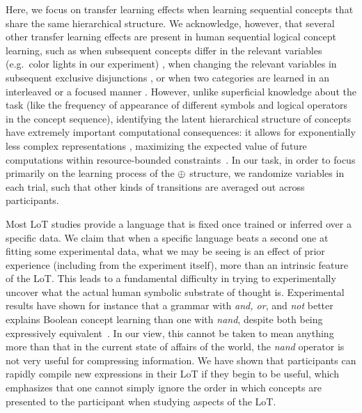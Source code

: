 \par Here, we focus on transfer learning effects when learning sequential concepts that share the same hierarchical structure. We acknowledge, however, that several other transfer learning effects are present in human sequential logical concept learning, such as when subsequent concepts differ in the relevant variables (e.g.\  color lights in our experiment) \cite{blair2009extremely}, when changing the relevant variables in subsequent exclusive disjunctions \cite{kruschke1996dimensional}, or when two categories are learned in an interleaved or a focused manner \cite{carvalho2014putting}. However, unlike superficial knowledge about the task (like the frequency of appearance of different symbols and logical operators in the concept sequence), identifying the latent hierarchical structure of concepts have extremely important computational consequences: it allows for exponentially less complex representations \cite{bengio2013representation,lake2015human}, maximizing the expected value of future computations within resource-bounded constraints~\cite{gershman2015computational}. In our task, in order to focus primarily on the learning process of the $\oplus$ structure, we randomize variables in each trial, such that other kinds of transitions are averaged out across participants. 

\par Most LoT studies provide a language that is fixed once trained or inferred over a specific data. We claim that when a specific language beats a second one at fitting some experimental data, what we may be seeing is an effect of prior experience (including from the experiment itself), more than an intrinsic feature of the LoT. This leads to a fundamental difficulty in trying to experimentally uncover what the actual human symbolic substrate of thought is. Experimental results have shown for instance that a grammar with \textit{and, or}, and \textit{not} better explains Boolean concept learning than one with \textit{nand}, despite both being expressively equivalent~\cite{piantadosi2016logical}.  In our view, this cannot be taken to mean anything more than that in the current state of affairs of the world, the \textit{nand} operator is not very useful for compressing information. We have shown that participants can rapidly compile new expressions in their LoT if they begin to be useful, which emphasizes that one cannot simply ignore the order in which concepts are presented to the participant when studying aspects of the LoT.


